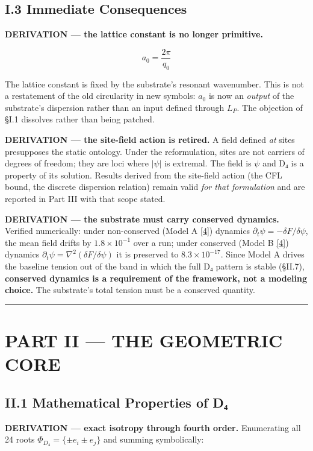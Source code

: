 \documentclass[a4paper,11pt]{article}
\begin{document}
\subsection*{I.3 Immediate Consequences}

\textbf{DERIVATION — the lattice constant is no longer primitive.}

\[a_0=\frac{2\pi}{q_0}\]

The lattice constant is fixed by the substrate's resonant wavenumber. This is not a restatement of the old circularity in new symbols: $a_0$ is now an \textit{output} of the substrate's dispersion rather than an input defined through $L_P$. The objection of §I.1 dissolves rather than being patched.

\textbf{DERIVATION — the site-field action is retired.} A field defined \textit{at} sites presupposes the static ontology. Under the reformulation, sites are not carriers of degrees of freedom; they are loci where $|\psi|$ is extremal. The field is $\psi$ and D₄ is a property of its solution. Results derived from the site-field action (the CFL bound, the discrete dispersion relation) remain valid \textit{for that formulation} and are reported in Part III with that scope stated.

\textbf{DERIVATION — the substrate must carry conserved dynamics.} Verified numerically: under non-conserved (Model A \hyperref[ref4]{[4]}) dynamics $\partial_t\psi=-\delta F/\delta\psi$, the mean field drifts by $1.8\times10^{-1}$ over a run; under conserved (Model B \hyperref[ref4]{[4]}) dynamics $\partial_t\psi=\nabla^2(\delta F/\delta\psi)$ it is preserved to $8.3\times10^{-17}$. Since Model A drives the baseline tension out of the band in which the full D₄ pattern is stable (§II.7), \textbf{conserved dynamics is a requirement of the framework, not a modeling choice.} The substrate's total tension must be a conserved quantity.

\medskip\hrule\medskip

\section*{PART II — THE GEOMETRIC CORE}

\subsection*{II.1 Mathematical Properties of D₄}

\textbf{DERIVATION — exact isotropy through fourth order.} Enumerating all 24 roots $\Phi_{D_4}=\{\pm e_i\pm e_j\}$ and summing symbolically:
\end{document}
